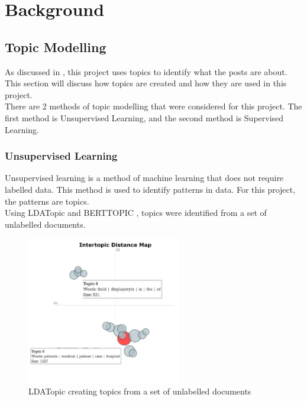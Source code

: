 \chapter{Background}
\label{ch:background}

\section{Topic Modelling}\label{sec:topic_modelling}
As discussed in , this project uses topics to identify what the posts are about. This section will discuss
how topics are created and how they are used in this project.\\
There are 2 methods of topic modelling that were considered for this project. The first method is Unsupervised Learning, and the
second method is Supervised Learning.\\
\subsection{Unsupervised Learning}
Unsupervised learning is a method of machine learning that does not require labelled data. This method is used to identify patterns
in data. For this project, the patterns are topics.\\
Using LDATopic \cite{LDATopic} and BERTTOPIC \cite{BERTTOPIC}, topics were identified from a set of unlabelled documents.
\begin{figure}[hbtp]
    \centering
    \includegraphics[width=0.6\textwidth]{../images/ldatopic.png}
    \caption{LDATopic creating topics from a set of unlabelled documents}
    \label{fig:ldatopic}
\end{figure}

